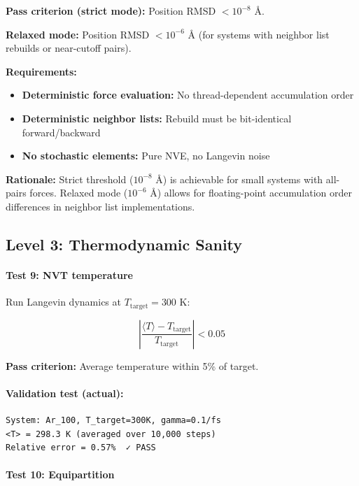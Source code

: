 \documentclass[11pt]{article}
\begin{document}
\textbf{Pass criterion (strict mode):} Position RMSD $< 10^{-8}$ Å.

\textbf{Relaxed mode:} Position RMSD $< 10^{-6}$ Å (for systems with neighbor list rebuilds or near-cutoff pairs).

\textbf{Requirements:}
\begin{itemize}
\item \textbf{Deterministic force evaluation:} No thread-dependent accumulation order
\item \textbf{Deterministic neighbor lists:} Rebuild must be bit-identical forward/backward
\item \textbf{No stochastic elements:} Pure NVE, no Langevin noise
\end{itemize}

\textbf{Rationale:} Strict threshold ($10^{-8}$ Å) is achievable for small systems with all-pairs forces. Relaxed mode ($10^{-6}$ Å) allows for floating-point accumulation order differences in neighbor list implementations.

\subsection{Level 3: Thermodynamic Sanity}

\paragraph{Test 9: NVT temperature}

Run Langevin dynamics at $T_{\text{target}} = 300$ K:

\begin{equation}
\left|\frac{\langle T \rangle - T_{\text{target}}}{T_{\text{target}}}\right| < 0.05
\end{equation}

\textbf{Pass criterion:} Average temperature within 5\% of target.

\paragraph{Validation test (actual):}

\begin{verbatim}
System: Ar_100, T_target=300K, gamma=0.1/fs
<T> = 298.3 K (averaged over 10,000 steps)
Relative error = 0.57%  ✓ PASS
\end{verbatim}

\paragraph{Test 10: Equipartition}
\end{document}
